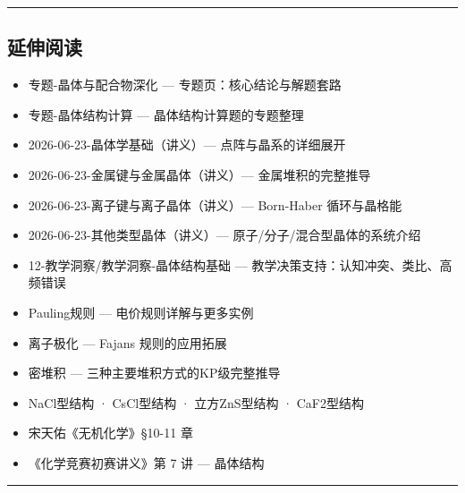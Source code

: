 \begin{center}\rule{0.5\linewidth}{0.5pt}\end{center}

\subsection{延伸阅读}\label{ux5ef6ux4f38ux9605ux8bfb}

\begin{itemize}
\tightlist
\item
  专题-晶体与配合物深化 --- 专题页：核心结论与解题套路
\item
  专题-晶体结构计算 --- 晶体结构计算题的专题整理
\item
  2026-06-23-晶体学基础（讲义）--- 点阵与晶系的详细展开
\item
  2026-06-23-金属键与金属晶体（讲义）--- 金属堆积的完整推导
\item
  2026-06-23-离子键与离子晶体（讲义）--- Born-Haber 循环与晶格能
\item
  2026-06-23-其他类型晶体（讲义）--- 原子/分子/混合型晶体的系统介绍
\item
  12-教学洞察/教学洞察-晶体结构基础 --- 教学决策支持：认知冲突、类比、高频错误
\item
  Pauling规则 --- 电价规则详解与更多实例
\item
  离子极化 --- Fajans 规则的应用拓展
\item
  密堆积 --- 三种主要堆积方式的KP级完整推导
\item
  NaCl型结构 · CsCl型结构 · 立方ZnS型结构 · CaF2型结构
\item
  宋天佑《无机化学》§10-11 章
\item
  《化学竞赛初赛讲义》第 7 讲 --- 晶体结构
\end{itemize}

\begin{center}\rule{0.5\linewidth}{0.5pt}\end{center}
